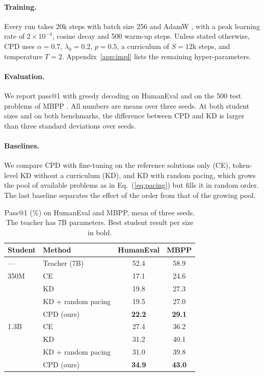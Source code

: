 \documentclass{article} %
\begin{document}
\paragraph{Training.}
Every run takes 20k steps with batch size 256 and AdamW \citep{kingma2015adam,loshchilov2019decoupled}, with a peak learning rate of $2 \times 10^{-4}$, cosine decay and 500 warm-up steps.
Unless stated otherwise, CPD uses $\alpha = 0.7$, $\lambda_0 = 0.2$, $p = 0.5$, a curriculum of $S = 12$k steps, and temperature $T = 2$.
Appendix~\ref{app:impl} lists the remaining hyper-parameters.

\paragraph{Evaluation.}
We report pass@1 with greedy decoding on HumanEval \citep{chen2021evaluating} and on the 500 test problems of MBPP \citep{austin2021program}.
All numbers are means over three seeds.
At both student sizes and on both benchmarks, the difference between CPD and KD is larger than three standard deviations over seeds.

\paragraph{Baselines.}
We compare CPD with fine-tuning on the reference solutions only (CE), token-level KD without a curriculum (KD), and KD with random pacing, which grows the pool of available problems as in Eq.~(\ref{eq:pacing}) but fills it in random order.
The last baseline separates the effect of the order from that of the growing pool.

\begin{table}[t]
\caption{Pass@1 (\%) on HumanEval and MBPP, mean of three seeds. The teacher has 7B parameters. Best student result per size in bold.}
\label{tab:main}
\centering
\begin{tabular}{llcc}
\toprule
Student & Method & HumanEval & MBPP \\
\midrule
--- & Teacher (7B) & 52.4 & 58.9 \\
\midrule
350M & CE & 17.1 & 24.6 \\
 & KD & 19.8 & 27.3 \\
 & KD + random pacing & 19.5 & 27.0 \\
 & CPD (ours) & \textbf{22.2} & \textbf{29.1} \\
\midrule
1.3B & CE & 27.4 & 36.2 \\
 & KD & 31.2 & 40.1 \\
 & KD + random pacing & 31.0 & 39.8 \\
 & CPD (ours) & \textbf{34.9} & \textbf{43.0} \\
\bottomrule
\end{tabular}
\end{table}
\end{document}
